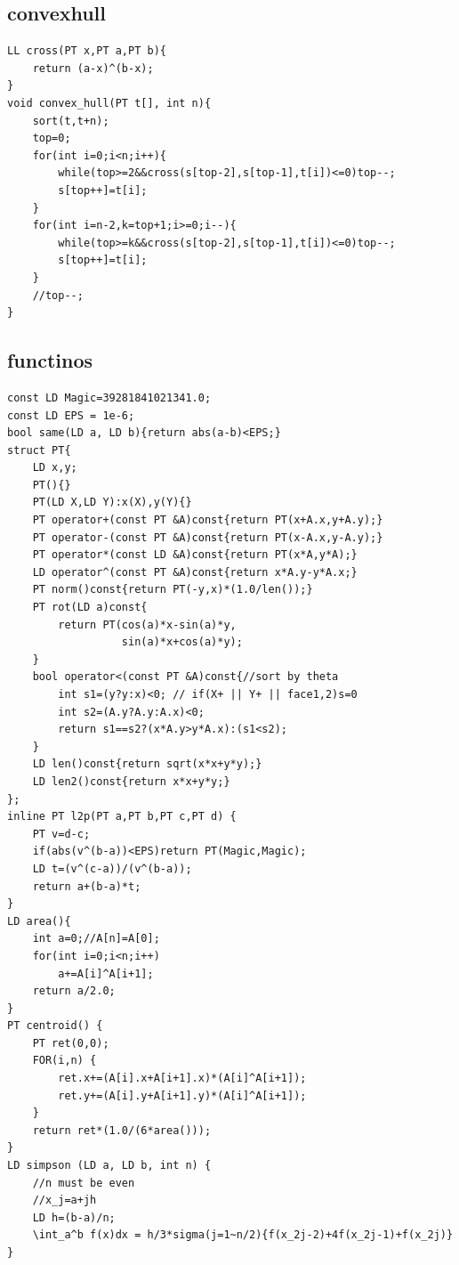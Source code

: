 \documentclass[10pt,twocolumn,oneside]{article}
\begin{document}
\subsection{convexhull}
\begin{lstlisting}
LL cross(PT x,PT a,PT b){
	return (a-x)^(b-x);
}
void convex_hull(PT t[], int n){
	sort(t,t+n);
	top=0;
	for(int i=0;i<n;i++){
		while(top>=2&&cross(s[top-2],s[top-1],t[i])<=0)top--;
		s[top++]=t[i];
	}
	for(int i=n-2,k=top+1;i>=0;i--){
		while(top>=k&&cross(s[top-2],s[top-1],t[i])<=0)top--;
		s[top++]=t[i];
	}
	//top--;
}

\end{lstlisting}
\subsection{functinos}
\begin{lstlisting}
const LD Magic=39281841021341.0;
const LD EPS = 1e-6;
bool same(LD a, LD b){return abs(a-b)<EPS;}
struct PT{
	LD x,y;
	PT(){}
	PT(LD X,LD Y):x(X),y(Y){}
	PT operator+(const PT &A)const{return PT(x+A.x,y+A.y);}
	PT operator-(const PT &A)const{return PT(x-A.x,y-A.y);}
	PT operator*(const LD &A)const{return PT(x*A,y*A);}
	LD operator^(const PT &A)const{return x*A.y-y*A.x;}
	PT norm()const{return PT(-y,x)*(1.0/len());}
	PT rot(LD a)const{
		return PT(cos(a)*x-sin(a)*y,
				  sin(a)*x+cos(a)*y);
	}
	bool operator<(const PT &A)const{//sort by theta
		int s1=(y?y:x)<0; // if(X+ || Y+ || face1,2)s=0
		int s2=(A.y?A.y:A.x)<0;
		return s1==s2?(x*A.y>y*A.x):(s1<s2);
	}
	LD len()const{return sqrt(x*x+y*y);}
	LD len2()const{return x*x+y*y;}
};
inline PT l2p(PT a,PT b,PT c,PT d) {
	PT v=d-c;
	if(abs(v^(b-a))<EPS)return PT(Magic,Magic);
	LD t=(v^(c-a))/(v^(b-a));
	return a+(b-a)*t;
}
LD area(){
	int a=0;//A[n]=A[0];
	for(int i=0;i<n;i++)
		a+=A[i]^A[i+1];
	return a/2.0;
}
PT centroid() {
	PT ret(0,0);
	FOR(i,n) {
		ret.x+=(A[i].x+A[i+1].x)*(A[i]^A[i+1]);
		ret.y+=(A[i].y+A[i+1].y)*(A[i]^A[i+1]);
	}
	return ret*(1.0/(6*area()));
}
LD simpson (LD a, LD b, int n) {
	//n must be even
	//x_j=a+jh
	LD h=(b-a)/n;
	\int_a^b f(x)dx = h/3*sigma(j=1~n/2){f(x_2j-2)+4f(x_2j-1)+f(x_2j)}
}

\end{lstlisting}
\end{document}
